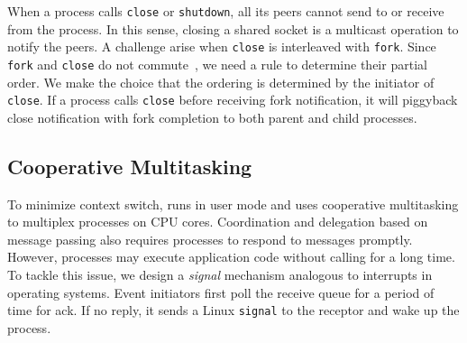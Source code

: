 When a process calls \texttt{close} or \texttt{shutdown}, all its peers cannot send to or receive from the process. In this sense, closing a shared socket is a multicast operation to notify the peers. A challenge arise when \texttt{close} is interleaved with \texttt{fork}. Since \texttt{fork} and \texttt{close} do not commute~\cite{clements2015scalable}, we need a rule to determine their partial order. We make the choice that the ordering is determined by the initiator of \texttt{close}. If a process calls \texttt{close} before receiving fork notification, it will piggyback close notification with fork completion to both parent and child processes.





\subsection{Cooperative Multitasking}
\label{subsec:process-mux}

To minimize context switch, \sys{} runs in user mode and uses cooperative multitasking to multiplex processes on CPU cores. Coordination and delegation based on message passing also requires processes to respond to messages promptly. However, processes may execute application code without calling \libipc{} for a long time. To tackle this issue, we design a \textit{signal} mechanism analogous to interrupts in operating systems. Event initiators  first poll the receive queue for a period of time for ack. If no reply, it sends a Linux \texttt{signal} to the receptor and wake up the process.

